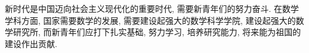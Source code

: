 新时代是中国迈向社会主义现代化的重要时代, 需要新青年们的努力奋斗. 在数学学科方面, 国家需要数学的发展, 需要建设起强大的数学科学学院, 建设起强大的数学研究所, 而新青年们应打下扎实基础, 努力学习, 培养研究能力, 将来能为祖国的建设作出贡献.
